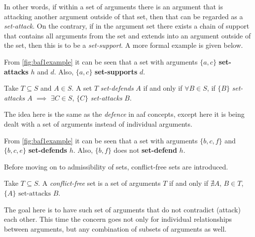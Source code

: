            In other words, if within a set of arguments there is an argument that is attacking another argument outside of that set, then that can be regarded as a \textit{set-attack}. On the contrary, if in the argument set there exists a chain of support that contains all arguments from the set and extends into an argument outside of the set, then this is to be a \textit{set-support}. A more formal example is given below.
            
            \begin{exa}
                From \autoref{fig:baf1example} it can be seen that a set with arguments $\{a, c\}$ \textbf{set-attacks} $h$ and $d$. Also, $\{a, c\}$ \textbf{set-supports} $d$.
                \label{exa:example12}
            \end{exa}
            
            \begin{definition}
                Take $T \subseteq S$ and $A \in S$. A set $T$ \textit{set-defends} $A$ if and only if $\forall B \in S$, if $\{B\}$ \textit{set-attacks} $A$ $\implies$ $\exists C \in S$, $\{C\}$ \textit{set-attacks} $B$.
                \label{definition:definition15}
            \end{definition}
            
            The idea here is the same as the \textit{defence} in \gls{aaf} concepts, except here it is being dealt with a set of arguments instead of individual arguments.
            
            \begin{exa}
                From \autoref{fig:baf1example} it can be seen that a set with arguments $\{b, c, f\}$ and $\{b, c, e\}$ \textbf{set-defends} $h$. Also, $\{b, f\}$ does not \textbf{set-defend} $h$.
                \label{exa:example13}
            \end{exa}
            
            Before moving on to admissibility of sets, conflict-free sets are introduced.
            
            \begin{definition}
                Take $T \subseteq S$. A \textit{conflict-free} set is a set of arguments $T$ if and only if $\nexists A$, $B \in T$, $\{A\} \text{ set-attacks } B$.
                \label{definition:definition16}
            \end{definition}
            
            The goal here is to have such set of arguments that do not contradict (attack) each other. This time the concern goes not only for individual relationships between arguments, but any combination of subsets of arguments as well.
            
